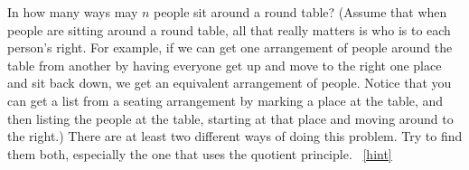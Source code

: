 \documentclass{book}
\begin{document}
\setcounter{project}{110}
\addtocounter{project}{-1}
\begin{activity}[]\label{roundtable}
\hypertarget{p-802}{}%
In how many ways may \(n\) people sit around a round table? (Assume that when people are sitting around a round table, all that really matters is who is to each person's right. For example, if we can get one arrangement of people around the table from another by having everyone get up and move to the right one place and sit back down, we get an equivalent arrangement of people. Notice that you can get a list from a seating arrangement by marking a place at the table, and then listing the people at the table, starting at that place and moving around to the right.) There are at least two different ways of doing this problem. Try to find them both, especially the one that uses the quotient principle.%
~\hfill{\tiny\hyperlink{a-110}{[hint]}\hypertarget{q-110}{}}\end{activity}
\end{document}
